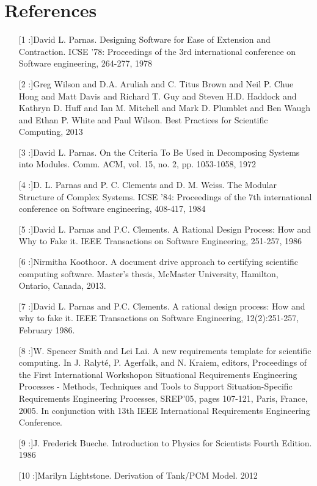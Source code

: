 \documentclass[12pt]{article}
\begin{document}
\section{References}
\label{Sec:Refe}
\begin{itemize}
\item[[1]:]David L. Parnas. Designing Software for Ease of Extension and Contraction. ICSE '78: Proceedings of the 3rd international conference on Software engineering, 264-277, 1978
\item[[2]:]Greg Wilson and D.A. Aruliah and C. Titus Brown and Neil P. Chue Hong and Matt Davis and Richard T. Guy and Steven H.D. Haddock and Kathryn D. Huff and Ian M. Mitchell and Mark D. Plumblet and Ben Waugh and Ethan P. White and Paul Wilson. Best Practices for Scientific Computing, 2013
\item[[3]:]David L. Parnas. On the Criteria To Be Used in Decomposing Systems into Modules. Comm. ACM, vol. 15, no. 2, pp. 1053-1058, 1972
\item[[4]:]D. L. Parnas and P. C. Clements and D. M. Weiss. The Modular Structure of Complex Systems. ICSE '84: Proceedings of the 7th international conference on Software engineering, 408-417, 1984
\item[[5]:]David L. Parnas and P.C. Clements. A Rational Design Process: How and Why to Fake it. IEEE Transactions on Software Engineering, 251-257, 1986
\item[[6]:]Nirmitha Koothoor. A document drive approach to certifying scientific computing software. Master's thesis, McMaster University, Hamilton, Ontario, Canada, 2013.
\item[[7]:]David L. Parnas and P.C. Clements. A rational design process: How and why to fake it. IEEE Transactions on Software Engineering, 12(2):251-257, February 1986.
\item[[8]:]W. Spencer Smith and Lei Lai. A new requirements template for scientific computing. In J. Ralyt\'{e}, P. Agerfalk, and N. Kraiem, editors, Proceedings of the First International Workshopon Situational Requirements Engineering Processes - Methods, Techniques and Tools to Support Situation-Specific Requirements Engineering Processes, SREP'05, pages 107-121, Paris, France, 2005. In conjunction with 13th IEEE International Requirements Engineering Conference.
\item[[9]:]J. Frederick Bueche. Introduction to Physics for Scientists Fourth Edition. 1986
\item[[10]:]Marilyn Lightstone. Derivation of Tank/PCM Model. 2012
\end{itemize}
\end{document}
